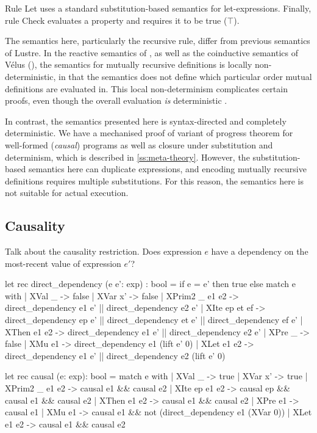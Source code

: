 \documentclass[sigplan,screen]{acmart}
\begin{document}
Rule Let uses a standard substitution-based semantics for let-expressions.
Finally, rule Check evaluates a property and requires it to be true ($\top$).

The semantics here, particularly the recursive rule, differ from previous semantics of Lustre.
In the reactive semantics of \citet{caspi1995functional}, as well as the coinductive semantics of Vélus \cite{bourke2017formally} (), the semantics for mutually recursive definitions is locally non-deterministic, in that the semantics does not define which particular order mutual definitions are evaluated in.
This local non-determinism complicates certain proofs, even though the overall evaluation \emph{is} deterministic .

In contrast, the semantics presented here is syntax-directed and completely deterministic.
We have a mechanised proof of variant of progress theorem for well-formed (\emph{causal}) programs as well as closure under substitution and determinism, which is described in \autoref{ss:meta-theory}.
However, the substitution-based semantics here can duplicate expressions, and encoding mutually recursive definitions requires multiple substitutions.
For this reason, the semantics here is not suitable for actual execution.

\subsection{Causality}
\label{ss:causality}

Talk about the causality restriction.
Does expression $e$ have a dependency on the most-recent value of expression $e'$?

\begin{code}
let rec direct_dependency (e e': exp) : bool =
  if e = e' then true
  else
  match e with
  | XVal _ -> false
  | XVar x' -> false
  | XPrim2 _ e1 e2 -> direct_dependency e1 e' || direct_dependency e2 e'
  | XIte ep et ef -> direct_dependency ep e' || direct_dependency et e' || direct_dependency ef e'
  | XThen e1 e2 -> direct_dependency e1 e' || direct_dependency e2 e'
  | XPre _ -> false
  | XMu e1 -> direct_dependency e1 (lift e' 0)
  | XLet e1 e2 -> direct_dependency e1 e' || direct_dependency e2 (lift e' 0)

let rec causal (e: exp): bool =
  match e with
  | XVal _ -> true
  | XVar x' -> true
  | XPrim2 _ e1 e2 -> causal e1 && causal e2
  | XIte ep e1 e2 -> causal ep && causal e1 && causal e2
  | XThen e1 e2 -> causal e1 && causal e2
  | XPre e1 -> causal e1
  | XMu e1 -> causal e1 && not (direct_dependency e1 (XVar 0))
  | XLet e1 e2 -> causal e1 && causal e2
\end{code}
\end{document}
